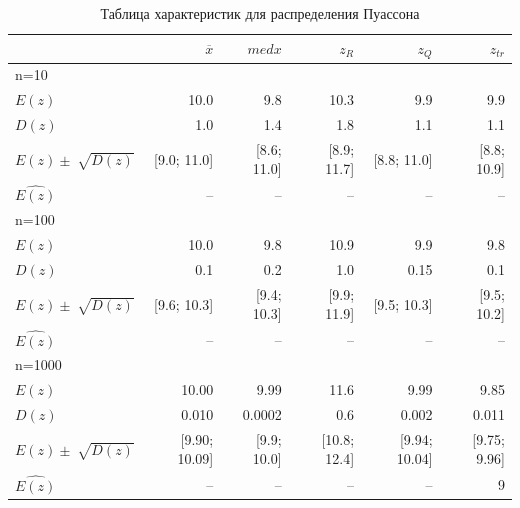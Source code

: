 \documentclass[a4paper,14pt]{article}
\begin{document}
	\begin{table}[H]
		\centering
		\begin{tabular}[t]{|l|r|r|r|r|r|}
			\hline
			& $\overline{x}$ & $med x$ & $z_R$ & $z_Q$ & $z_{tr}$\\\hline\hline
			n=10 & & & & &\\\hline
			$E(z)$ & 10.0 & 9.8 & 10.3 & 9.9 & 9.9\\\hline
			$D(z)$ & 1.0 & 1.4 & 1.8 & 1.1 & 1.1\\\hline
			$E(z)\pm\sqrt[]{D(z)}$ & [9.0; 11.0] & [8.6; 11.0] & [8.9; 11.7] & [8.8; 11.0] & [8.8; 10.9] \\\hline
			$\hat{E(z)}$ & -- & -- & -- & -- &  --\\\hline
			n=100 & & & & &\\\hline
			$E(z)$ & 10.0 & 9.8 & 10.9 & 9.9 & 9.8\\\hline
			$D(z)$ & 0.1 & 0.2 & 1.0 & 0.15 & 0.1\\\hline
			$E(z)\pm\sqrt[]{D(z)}$ & [9.6; 10.3] & [9.4; 10.3] & [9.9; 11.9] & [9.5; 10.3] & [9.5; 10.2]\\\hline
			$\hat{E(z)}$ & -- & -- & -- & -- &  --\\\hline
			n=1000 & & & & &\\\hline
			$E(z)$ & 10.00 & 9.99 & 11.6 & 9.99 & 9.85\\\hline
			$D(z)$ & 0.010 & 0.0002 & 0.6 & 0.002 & 0.011\\\hline
			$E(z)\pm\sqrt[]{D(z)}$ & [9.90; 10.09] & [9.9; 10.0] & [10.8; 12.4] & [9.94; 10.04] & [9.75; 9.96] \\\hline
			$\hat{E(z)}$ & -- & -- & -- & -- &  9 \\\hline
		\end{tabular}
		\caption{Таблица характеристик для распределения Пуассона}
		\label{tab:poisson}
	\end{table}
	
\end{document}

